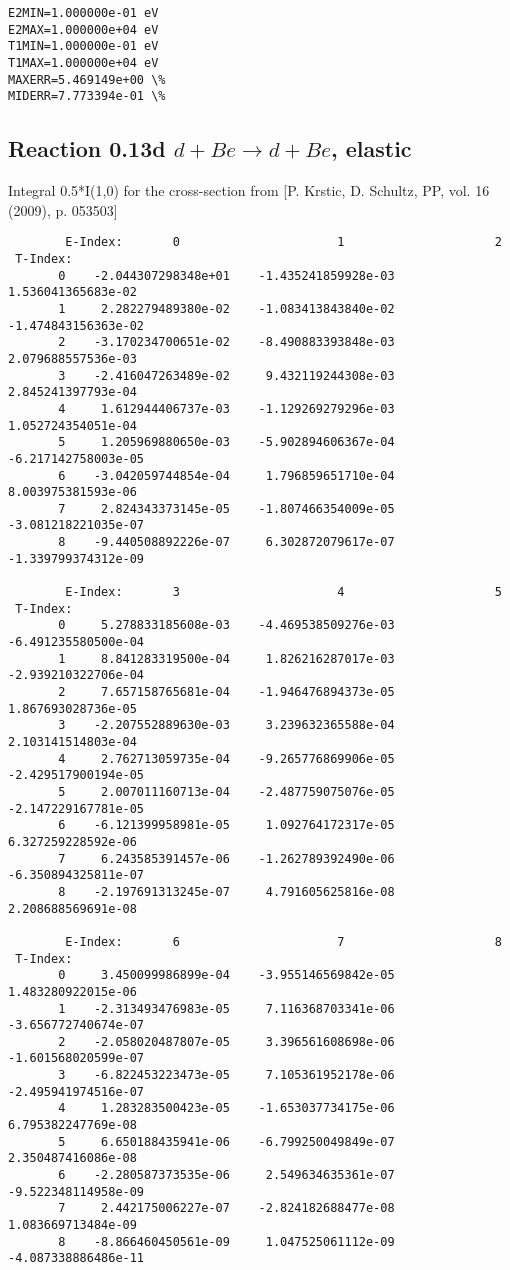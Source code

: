 \documentclass[12pt,dvipdfmx]{article}
\begin{document}
{\begin{small}
\begin{verbatim}
E2MIN=1.000000e-01 eV
E2MAX=1.000000e+04 eV
T1MIN=1.000000e-01 eV
T1MAX=1.000000e+04 eV
MAXERR=5.469149e+00 \%
MIDERR=7.773394e-01 \%
\end{verbatim}\end{small}
\newpage

\subsection{
Reaction 0.13d  $d + Be \rightarrow d + Be$, elastic}

Integral 0.5*I(1,0) for the cross-section from [P. Krstic, D. Schultz, PP, vol. 16 (2009), p. 053503]

\begin{small}\begin{verbatim}
        E-Index:       0                      1                     2
 T-Index:
       0    -2.044307298348e+01    -1.435241859928e-03     1.536041365683e-02
       1     2.282279489380e-02    -1.083413843840e-02    -1.474843156363e-02
       2    -3.170234700651e-02    -8.490883393848e-03     2.079688557536e-03
       3    -2.416047263489e-02     9.432119244308e-03     2.845241397793e-04
       4     1.612944406737e-03    -1.129269279296e-03     1.052724354051e-04
       5     1.205969880650e-03    -5.902894606367e-04    -6.217142758003e-05
       6    -3.042059744854e-04     1.796859651710e-04     8.003975381593e-06
       7     2.824343373145e-05    -1.807466354009e-05    -3.081218221035e-07
       8    -9.440508892226e-07     6.302872079617e-07    -1.339799374312e-09

        E-Index:       3                      4                     5
 T-Index:
       0     5.278833185608e-03    -4.469538509276e-03    -6.491235580500e-04
       1     8.841283319500e-04     1.826216287017e-03    -2.939210322706e-04
       2     7.657158765681e-04    -1.946476894373e-05     1.867693028736e-05
       3    -2.207552889630e-03     3.239632365588e-04     2.103141514803e-04
       4     2.762713059735e-04    -9.265776869906e-05    -2.429517900194e-05
       5     2.007011160713e-04    -2.487759075076e-05    -2.147229167781e-05
       6    -6.121399958981e-05     1.092764172317e-05     6.327259228592e-06
       7     6.243585391457e-06    -1.262789392490e-06    -6.350894325811e-07
       8    -2.197691313245e-07     4.791605625816e-08     2.208688569691e-08

        E-Index:       6                      7                     8
 T-Index:
       0     3.450099986899e-04    -3.955146569842e-05     1.483280922015e-06
       1    -2.313493476983e-05     7.116368703341e-06    -3.656772740674e-07
       2    -2.058020487807e-05     3.396561608698e-06    -1.601568020599e-07
       3    -6.822453223473e-05     7.105361952178e-06    -2.495941974516e-07
       4     1.283283500423e-05    -1.653037734175e-06     6.795382247769e-08
       5     6.650188435941e-06    -6.799250049849e-07     2.350487416086e-08
       6    -2.280587373535e-06     2.549634635361e-07    -9.522348114958e-09
       7     2.442175006227e-07    -2.824182688477e-08     1.083669713484e-09
       8    -8.866460450561e-09     1.047525061112e-09    -4.087338886486e-11


\end{verbatim}
\end{small}}
\end{document}
